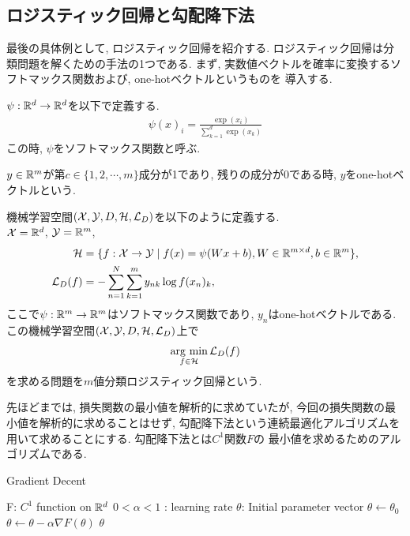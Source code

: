 \subsection{ロジスティック回帰と勾配降下法}
最後の具体例として, ロジスティック回帰を紹介する. 
ロジスティック回帰は分類問題を解くための手法の1つである.
まず, 実数値ベクトルを確率に変換するソフトマックス関数および, one-hotベクトルというものを
導入する. 
\begin{Defi}[ソフトマックス関数]
    $\psi:\mathbb{R}^d\to\mathbb{R}^d$を以下で定義する.
    \begin{align*}
        \psi(x)_{i} = \frac{\exp(x_i)}{\sum_{k = 1}^d\exp(x_k)}
    \end{align*}
    この時, $\psi$をソフトマックス関数と呼ぶ.
\end{Defi}
\begin{Defi}
    $y\in\mathbb{R}^m$が第$c\in\{1, 2, \cdots, m\}$成分が1であり, 残りの成分が0である時, 
    $y$をone-hotベクトルという.
\end{Defi}
\begin{Ex}[$m$値分類ロジスティック回帰]
    機械学習空間$(\mathcal{X}, \mathcal{Y}, D, \mathcal{H}, \mathcal{L}_{D})$を以下のように定義する.\\
    $\mathcal{X}=\mathbb{R}^d$, $\mathcal{Y} = \mathbb{R}^m$, 
    \begin{align*}
        \mathcal{H} &= \{f:\mathcal{X}\to\mathcal{Y}\mid f(x) = \psi(Wx + b), W\in\mathbb{R}^{m\times d}, b\in\mathbb{R}^m\},\\
        \mathcal{L}_{D}(f) &= -\sum_{n = 1}^{N}\sum_{k = 1}^{m}y_{nk}\log f(x_n)_{k},
    \end{align*}
    ここで$\psi:\mathbb{R}^m\to\mathbb{R}^m$はソフトマックス関数であり, $y_{n}$はone-hotベクトルである.\\
    この機械学習空間$(\mathcal{X}, \mathcal{Y}, D, \mathcal{H}, \mathcal{L}_{D})$上で
    \begin{align*}
        \mathop{\rm arg~min}\limits_{f\in\mathcal{H}}\mathcal{L}_{D}(f)
    \end{align*}
    を求める問題を$m$値分類ロジスティック回帰という.
\end{Ex}
先ほどまでは, 損失関数の最小値を解析的に求めていたが, 今回の損失関数の最小値を解析的に求めることはせず,
勾配降下法という連続最適化アルゴリズムを用いて求めることにする. 勾配降下法とは$C^{1}$関数$F$の
最小値を求めるためのアルゴリズムである.
\begin{algorithm}[H]
    \caption{Gradient Decent}
    \begin{algorithmic}
        \REQUIRE F: $C^1$ function on $\mathbb{R}^{d}$
        \REQUIRE $0<\alpha<1$ : learning rate 
        \REQUIRE $\theta$: Initial parameter vector
        \STATE $\theta\leftarrow\theta_{0}$
        \STATE $\theta\leftarrow\theta - \alpha\nabla F(\theta)$ 
        \ENDWHILE
        \RETURN $\theta$
    \end{algorithmic}
\end{algorithm}
